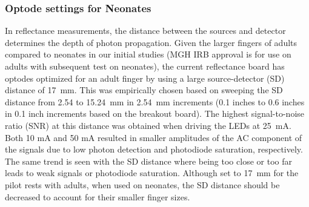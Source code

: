 \subsubsection{Optode settings for Neonates}
In reflectance measurements, the distance between the sources and detector determines the depth of photon propagation. Given the larger fingers of adults compared to neonates in our initial studies (MGH IRB approval is for use on adults with subsequent test on neonates), the current reflectance board has optodes optimized for an adult finger by using a large source-detector (SD) distance of 17~mm. This was empirically chosen based on sweeping the SD distance from 2.54 to 15.24~mm in 2.54~mm increments (0.1 inches to 0.6 inches in 0.1 inch increments based on the breakout board). The highest signal-to-noise ratio (SNR) at this distance was obtained when driving the LEDs at 25~mA. Both 10 mA and 50 mA resulted in smaller amplitudes of the AC component of the signals due to low photon detection and photodiode saturation, respectively. The same trend is seen with the SD distance where being too close or too far leads to weak signals or photodiode saturation. Although set to 17~mm for the pilot rests with adults, when used on neonates, the SD distance should be decreased to account for their smaller finger sizes. 

